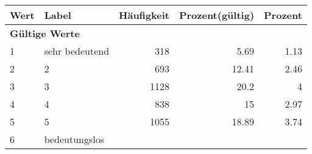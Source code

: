      \begin{longtable}{lXrrr}
     \toprule
     \textbf{Wert} & \textbf{Label} & \textbf{Häufigkeit} & \textbf{Prozent(gültig)} & \textbf{Prozent} \\
     \endhead
     \midrule
     \multicolumn{5}{l}{\textbf{Gültige Werte}}\\

     1 &
     \multicolumn{1}{X}{ sehr bedeutend   } &


       \num{318} &
       \num[round-mode=places,round-precision=2]{5.69} &
         \num[round-mode=places,round-precision=2]{1.13} \\

     2 &
     \multicolumn{1}{X}{ 2   } &


       \num{693} &
       \num[round-mode=places,round-precision=2]{12.41} &
         \num[round-mode=places,round-precision=2]{2.46} \\

     3 &
     \multicolumn{1}{X}{ 3   } &


       \num{1128} &
       \num[round-mode=places,round-precision=2]{20.2} &
         \num[round-mode=places,round-precision=2]{4} \\

     4 &
     \multicolumn{1}{X}{ 4   } &


       \num{838} &
       \num[round-mode=places,round-precision=2]{15} &
         \num[round-mode=places,round-precision=2]{2.97} \\

     5 &
     \multicolumn{1}{X}{ 5   } &


       \num{1055} &
       \num[round-mode=places,round-precision=2]{18.89} &
         \num[round-mode=places,round-precision=2]{3.74} \\

     6 &
     \multicolumn{1}{X}{ bedeutungslos   } &



\end{longtable}
